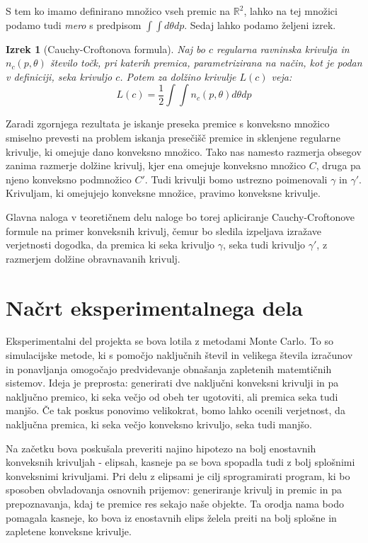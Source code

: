 \documentclass[a4paper]{article}
\newtheorem{izrek}{Izrek}
\begin{document}
S tem ko imamo definirano množico vseh premic na $\mathbb{R}^2$, lahko na tej množici podamo tudi \textit{mero} s  predpisom $ \int \int d\theta dp$. Sedaj lahko podamo željeni izrek.

\begin{izrek}[Cauchy-Croftonova formula]
 Naj bo $c$ regularna ravninska krivulja in $n_c (p, \theta)$  število točk, pri katerih premica, parametrizirana na način, kot je podan v definiciji, seka krivuljo $c$. Potem za dolžino krivulje $L(c)$ veja: $$L(c) = \frac{1}{2}\int \int n_c (p, \theta) d\theta dp $$
 \end{izrek}

\vspace{3 mm}

Zaradi zgornjega rezultata je iskanje preseka premice s konveksno množico smiselno prevesti na problem iskanja presečišč premice in sklenjene regularne krivulje, ki omejuje dano konveksno množico. Tako nas namesto razmerja obsegov zanima razmerje dolžine krivulj, kjer ena omejuje konveksno množico $C$, druga pa njeno konveksno podmnožico $C'$. Tudi krivulji bomo ustrezno poimenovali $\gamma$ in $\gamma '$. Krivuljam, ki omejujejo konveksne množice, pravimo konveksne krivulje. 

Glavna naloga v teoretičnem delu naloge bo torej apliciranje Cauchy-Croftonove formule na primer konveksnih krivulj, čemur bo sledila izpeljava izražave verjetnosti dogodka, da premica ki seka krivuljo $\gamma$, seka tudi krivuljo $\gamma'$, z razmerjem dolžine obravnavanih krivulj. 



\section{Načrt eksperimentalnega dela}
Eksperimentalni del projekta se bova lotila z metodami Monte Carlo. To so simulacijske metode, ki s pomočjo naključnih števil in velikega števila izračunov in ponavljanja omogočajo predvidevanje obnašanja zapletenih matemtičnih sistemov. Ideja je preprosta: generirati dve naključni konveksni krivulji in pa naključno premico, ki seka večjo od obeh ter ugotoviti, ali premica seka tudi manjšo. Če tak poskus ponovimo velikokrat, bomo lahko ocenili verjetnost, da naključna premica, ki seka večjo konveksno krivuljo, seka tudi manjšo.

Na začetku bova poskušala preveriti najino hipotezo na bolj enostavnih konveksnih krivuljah - elipsah, kasneje pa se bova spopadla tudi z bolj splošnimi konveksnimi krivuljami. Pri delu z elipsami je cilj sprogramirati program, ki bo sposoben obvladovanja osnovnih prijemov: generiranje krivulj in premic in pa prepoznavanja, kdaj te premice res sekajo naše objekte. Ta orodja nama bodo pomagala kasneje, ko bova iz enostavnih elips želela preiti na bolj splošne in zapletene konveksne krivulje.
\end{document}

